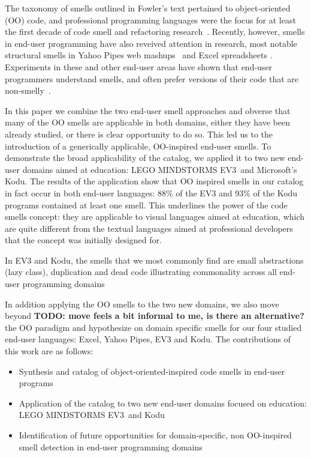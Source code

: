 \documentclass{sig-alternate}
\newcommand{\todo}[1]{\textbf{TODO: #1}}
\newcommand{\ms}{LEGO MINDSTORMS EV3}
\begin{document}
The taxonomy of smells outlined in Fowler's text pertained to object-oriented (OO) code, and professional programming languages were the focus for at least the first decade of code smell  and refactoring research~\cite{Mens:2004:SSR:972215.972286}. Recently, however, smells in end-user programming have also reveived attention in research, most notable structural smells in Yahoo Pipes web mashups~\cite{Stolee2011} and Excel spreadsheets \cite{Hermans2012inter}. Experiments in these and other end-user areas have shown that end-user programmers understand smells, and often prefer versions of their code that are non-smelly~\cite{Hermans2012intra, StoleeTSE2013, chambers2013smell}.


In this paper we combine the two end-user smell approaches and obverse that many of the OO smells are applicable in both domains, either they have been already studied, or there is clear opportunity to do so. This led us to the introduction of a generically applicable, OO-inspired end-user smells. To demonstrate the broad applicability of the catalog, we applied it to two new end-user domains aimed at education: \ms~and Microsoft's Kodu. The results of the application show that OO inspired smells in our catalog in fact occur in both end-user languages: 88\% of the EV3 and 93\% of the Kodu programs contained at least one smell. This underlines the power of the code smells concept: they are applicable to visual languages aimed at education, which are quite different from the textual languages aimed at professional developers that the concept was initially designed for. 

In EV3 and Kodu, the smells that we most commonly find are small abstractions (lazy class), duplication and dead code illustrating commonality across all end-user programming domains
  
In addition applying the OO smells to the two new domains, we also move beyond \todo{move feels a bit informal to me, is there an alternative?} the OO paradigm and hypothesize on domain specific smells for our four studied end-user languages: Excel, Yahoo Pipes, EV3 and Kodu. The contributions of this work are as follows:

\begin{itemize}
	\item Synthesis and catalog of object-oriented-inspired code smells in end-user programs
	\item Application of the catalog to two new end-user domains focused on education: \ms~and Kodu
	\item Identification of future opportunities for domain-specific, non OO-inspired smell detection in end-user programming domains
\end{itemize}
\end{document}
